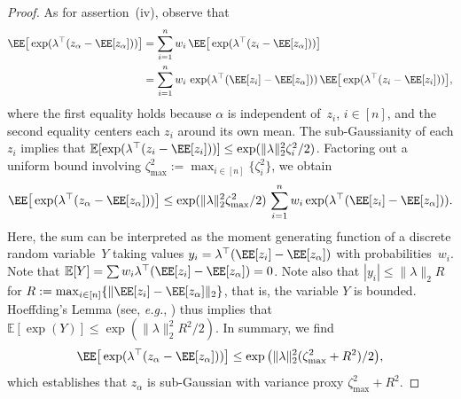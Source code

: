 \documentclass[11pt]{article}
\begin{document}
\begin{proof}
As for assertion~(iv), observe that
\begin{equation*}
    \begin{aligned}
    \EE\big[ \exp(\lambda^\top (z_\alpha - \EE[z_\alpha]))\big] 
    & = \sum_{i=1}^n w_i\,\EE\big[\exp(\lambda^\top (z_i-\EE[z_\alpha])) \big] \\
    & = \sum_{i=1}^n w_i\,\exp(\lambda^\top (\EE[z_i]-\EE[z_\alpha])) \, \EE\big[\exp(\lambda^\top (z_i-\EE[z_i])) \big], 
\end{aligned}
\end{equation*}
where the first equality holds because $\alpha$ is independent of~$z_i$, $i\in[n]$, and the second equality centers each $z_i$ around its own mean. The sub-Gaussianity of each $z_i$ implies that $\mathbb{E}[\exp(\lambda^\top (z_i - \EE[z_i]))] \leq \exp(\|\lambda\|_2^2 \zeta_i^2 / 2)$. Factoring out a uniform bound involving $\zeta_{\max}^2 := \max_{i \in [n]} \{\zeta_i^2\}$, we obtain
\[
   \EE\big[ \exp(\lambda^\top (z_\alpha - \EE[z_\alpha]))\big]  \leq \exp(\|\lambda\|_2^2 \zeta_{\max}^2/2) \, \sum_{i=1}^n w_i \exp(\lambda^\top (\EE[z_i]-\EE[z_\alpha])) .
\]
Here, the sum can be interpreted as the moment generating function of a discrete random variable~$Y$ taking values $y_i=\lambda^\top (\EE[z_i]-\EE[z_\alpha])$ with probabilities~$w_i$. Note that $\mathbb{E}[Y] = \sum w_i \lambda^\top (\EE[z_i] - \EE[z_\alpha]) = 0$. Note also that $|y_i |\leq \|\lambda\|_2 R$ for $R := \max_{i \in [n]} \{\|\EE[z_i] - \EE[z_\alpha]\|_2\}$, that is, the variable $Y$ is bounded. Hoeffding’s Lemma (see, {\em e.g.}, \cite[Example~2.4]{wainwright2019high}) thus implies that $\mathbb{E}[\exp(Y)] \leq \exp(\|\lambda\|_2^2 R^2 / 2)$. In summary, we find
\[
\EE\big[ \exp(\lambda^\top (z_\alpha - \EE[z_\alpha]))\big] \leq \exp\big(\|\lambda\|_2^2 (\zeta_{\max}^2 + R^2) /2 \big),
\]
which establishes that $z_\alpha$ is sub-Gaussian with variance proxy $\zeta_{\max}^2 + R^2$.
\end{proof}
\end{document}
